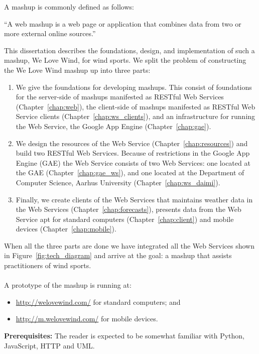 A mashup is commonly defined as follows:
\begin{definition}
``A web mashup is a web page or application that combines data from two or more
external online sources.'' \citep{programmableweb:faq}
\end{definition}
This dissertation describes the foundations, design, and implementation of such a
mashup, We Love Wind, for wind sports. We split the problem of constructing the
We Love Wind mashup up into three parts:
\begin{enumerate}
  \item We give the foundations for developing mashups. This consist of
  foundations for the server-side of mashups manifested as RESTful Web Services
  (Chapter~\ref{chap:web}), the client-side of mashups manifested as RESTful Web
  Service clients (Chapter~\ref{chap:ws_clients}), and an infrastructure for
  running the Web Service, the Google App Engine (Chapter~\ref{chap:gae}).
  \item We design the resources of the Web Service (Chapter~\ref{chap:resources})
and build two RESTful Web Services. Because of restrictions in the Google App
Engine (GAE) the Web Service consists of two Web Services: one located
at the GAE (Chapter~\ref{chap:gae_ws}), and one located at the Department of Computer
Science, Aarhus University (Chapter~\ref{chap:ws_daimi}).
  \item Finally, we create clients of the Web Services that maintains
  weather data in the Web Services
  (Chapter~\ref{chap:forecasts}), presents data from
  the Web Service apt for standard computers (Chapter~\ref{chap:client}) and
  mobile devices (Chapter~\ref{chap:mobile}).
\end{enumerate}
%
When all the three parts are done we have integrated all the Web Services shown
in Figure~\ref{fig:tech_diagram} and arrive at the goal: a mashup that assists
practitioners of wind sports. \\\\A prototype of the mashup is running at:
\begin{itemize}
  \item \url{http://welovewind.com/} for standard computers; and
  \item \url{http://m.welovewind.com/} for mobile devices.
\end{itemize}
\noindent
\textbf{Prerequisites:} The reader is expected to be somewhat familiar with
Python, JavaScript, HTTP and UML.
 

